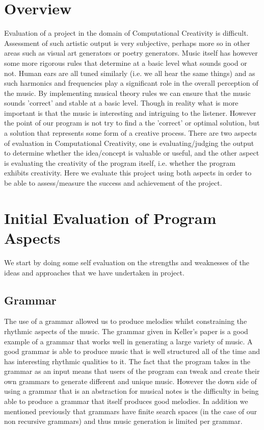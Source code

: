 \documentclass[pdftex,12pt,a4paper]{report}
\begin{document}
\section{Overview}
Evaluation of a project in the domain of Computational Creativity is difficult. Assessment of such artistic output is very subjective, perhaps more so in other areas such as visual art generators or poetry generators. Music itself has however some more rigorous rules that determine at a basic level what sounds good or not. Human ears are all tuned similarly (i.e. we all hear the same things) and as such harmonics and frequencies play a significant role in the overall perception of the music. By implementing musical theory rules we can ensure that the music sounds 'correct' and stable at a basic level. Though in reality what is more important is that the music is interesting and intriguing to the listener. 
However the point of our program is not try to find a the 'correct' or optimal solution, but a solution that represents some form of a creative process.
There are two aspects of evaluation in Computational Creativity, one is evaluating/judging the output to determine whether the idea/concept is valuable or useful, and the other aspect is evaluating the creativity of the program itself, i.e. whether the program exhibits creativity. Here we evaluate this project using both aspects in order to be able to assess/measure the success and achievement of the project.

\section{Initial Evaluation of Program Aspects}
We start by doing some self evaluation on the strengths and weaknesses of the ideas and approaches that we have undertaken in project.

\subsection{Grammar}
The use of a grammar allowed us to produce melodies whilst constraining the rhythmic aspects of the music. The grammar given in Keller's paper \cite{keller07} is a good example of a grammar that works well in generating a large variety of music. A good grammar is able to produce music that is well structured all of the time and has interesting rhythmic qualities to it. The fact that the program takes in the grammar as an input means that users of the program can tweak and create their own grammars to generate different and unique music. However the down side of using a grammar that is an abstraction for musical notes is the difficulty in being able to produce a grammar that itself produces good melodies. In addition we mentioned previously that grammars have finite search spaces (in the case of our non recursive grammars) and thus music generation is limited per grammar.
\end{document}
